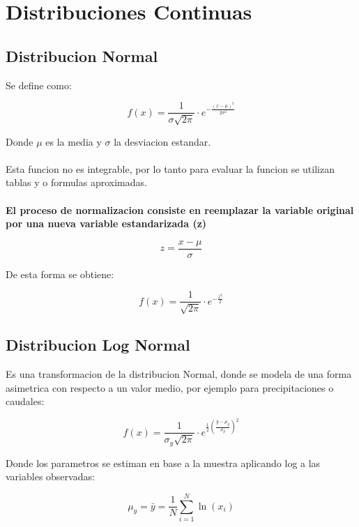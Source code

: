 \section{Distribuciones Continuas}

\subsection{Distribucion Normal}

Se define como:

\begin{equation}
    f(x) = \frac{1}{\sigma\sqrt{2\pi}} \cdot e^{-\frac{(x-\mu)^2}{2\sigma^2}}
\end{equation}

Donde $\mu$ es la media y $\sigma$ la desviacion estandar.
\\ \\
Esta funcion no es integrable, por lo tanto para evaluar la funcion se utilizan tablas y o formulas aproximadas.
\\ \\
\textbf{El proceso de normalizacion consiste en reemplazar la variable original por una nueva variable estandarizada (z) }

\begin{equation}
    z = \frac{x-\mu}{\sigma}
\end{equation}

De esta forma se obtiene:

\begin{equation}
    f(x) = \frac{1}{\sqrt{2\pi}} \cdot e^{-\frac{z^2}{2}}
\end{equation}

\subsection{Distribucion Log Normal}

Es una transformacion de la distribucion Normal, donde se modela de una forma asimetrica con respecto a un valor medio, por ejemplo para precipitaciones o caudales:

\begin{equation}
    f(x) = \frac{1}{\sigma_y\sqrt{2\pi}} \cdot e^{\frac{1}{2}(\frac{y-\mu_y}{\sigma_y})^2}
\end{equation}

Donde los parametros se estiman en base a la muestra aplicando log a las variables observadas:

\begin{equation}
    \mu_y = \bar{y} = \frac{1}{N} \sum_{i=1}^{N} \ln(x_i)
\end{equation}

